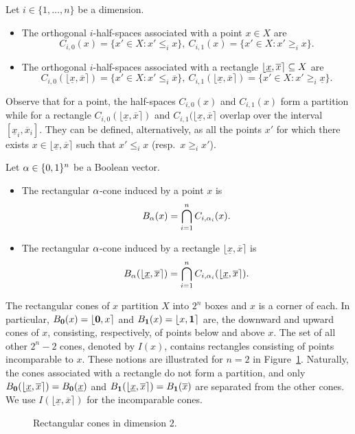 \documentclass{llncs}%
\newcommand{\ul}[1]{{\underline{#1}}}
\renewcommand{\ov}[1]{{\overline{#1}}}
\newcommand{\ux}{\ul{x}}
\newcommand{\ox}{\ov{x}}
\newcommand{\bx}[2]{{\lfloor #1,#2\rceil}}
\begin{document}
\begin{definition}
Let $i\in\{1,\ldots,n\}$ be a dimension.
\begin{itemize}
\item The orthogonal $i$-half-spaces associated with a point $x\in X$ are
$$C_{i,0}(x)=\{x'\in X:x'\leq_i x\},~ C_{i,1}(x)=\{x'\in X:x'\geq_i  x\}.$$
\item The orthogonal $i$-half-spaces associated with a rectangle $\bx{\ux}{\ox} \se X$ are
$$C_{i,0}(\bx{\ux}{\ox} )=\{x'\in X:x'\leq_i \ox\},~ C_{i,1}(\bx{\ux}{\ox} )=\{x'\in X:x'\geq_i  \ux\}.$$
\end{itemize}
\end{definition}
%
Observe that for a point, the half-spaces $C_{i,0}(x)$ and $C_{i,1}(x)$ form a partition while for a rectangle $C_{i,0}(\bx{\ux}{\ox} )$  and $C_{i,1}(\bx{\ux}{\ox}$ overlap over the interval $[\ux_i,\ox_i]$. They can be defined, alternatively, as all the points $x'$ for which there exists $x\in \bx{\ux}{\ox}$ such that $x'\leq_i x$ (resp.\ $x\geq_i x'$).

\begin{definition}
Let  $\alpha\in \{0,1\}^n$ be a Boolean vector.
\begin{itemize}
\item The rectangular $\alpha$-cone induced by  a point $x$ is
$$B_\alpha (x)=\bigcap_{i=1}^n C_{i,\alpha_i}(x).$$
\item The rectangular $\alpha$-cone induced by  a rectangle $\bx{\ux}{\ox}$ is
$$B_\a (\bx{\ux}{\ox})=\bigcap_{i=1}^n C_{i,\a_i}(\bx{\ux}{\ox}).$$
\end{itemize}
\end{definition}

The rectangular cones of $x$ partition $X$ into $2^n$ boxes and $x$ is a corner of each.
In particular, $B_{\vzer}(x)=\bx{\vzer}{x}$  and $B_{\vi}(x)=\bx{x}{\vi}$ are, the downward and upward cones of $x$, consisting, respectively, of points below and above $x$. The set of all other $2^n-2$ cones, denoted by $I(x)$, contains rectangles consisting of points incomparable to $x$. These notions are illustrated for $n=2$ in Figure~\ref{fig:cone-alph}. Naturally, the cones associated with a rectangle  do not form a partition, and only $B_{\vzer}(\bx{\ux}{\ox})=B_{\vzer}(\ux)$ and $B_{\vi}(\bx{\ux}{\ox})=B_{\vi}(\ox)$  are separated from the other cones. We use $I(\bx{\ux}{\ox})$ for the incomparable cones.

\begin{figure}
  \centering
 
  \caption{Rectangular cones in dimension $2$.}\label{fig:cone-alph}
\end{figure}
\end{document}
